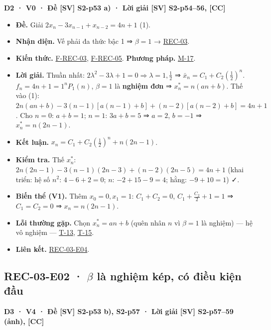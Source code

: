 \documentclass[
  10pt,
  twoside,openany]{book}
\providecommand{\tightlist}{%
  \setlength{\itemsep}{0pt}\setlength{\parskip}{0pt}}
\begin{document}
\textbf{D2 · V0 · Đề {[}SV{]} S2-p53 a) · Lời giải {[}SV{]} S2-p54--56,
{[}CC{]}}

\begin{itemize}
\tightlist
\item
  \textbf{Đề.} Giải \(2x_n-3x_{n-1}+x_{n-2}=4n+1\) (1).
\item
  \textbf{Nhận diện.} Vế phải đa thức bậc 1 ⇒ \(\beta=1\) →
  \protect\hyperlink{REC-03}{REC-03}.
\item
  \textbf{Kiến thức.} \protect\hyperlink{F-REC-03}{F-REC-03},
  \protect\hyperlink{F-REC-05}{F-REC-05}. \textbf{Phương pháp.}
  \protect\hyperlink{M-17}{M-17}.
\item
  \textbf{Lời giải.} Thuần nhất:
  \(2\lambda^2-3\lambda+1=0\Rightarrow\lambda=1,\frac12\) ⇒
  \(\bar x_n=C_1+C_2\left(\frac12\right)^n\). \(f_n=4n+1=1^n P_1(n)\),
  \(\beta=1\) là \textbf{nghiệm đơn} ⇒ \(x_n^*=n(an+b)\). Thế vào (1):
  \(2n(an+b)-3(n-1)[a(n-1)+b]+(n-2)[a(n-2)+b]=4n+1\). Cho \(n=0\):
  \(a+b=1\); \(n=1\): \(3a+b=5\) ⇒ \(a=2\), \(b=-1\) ⇒
  \(x_n^*=n(2n-1)\).
\item
  \textbf{Kết luận.} \(x_n=C_1+C_2\left(\frac12\right)^n+n(2n-1)\).
\item
  \textbf{Kiểm tra.} Thế \(x_n^*\):
  \(2n(2n-1)-3(n-1)(2n-3)+(n-2)(2n-5)=4n+1\) (khai triển: hệ số \(n^2\):
  \(4-6+2=0\); \(n\): \(-2+15-9=4\); hằng: \(-9+10=1\)) ✓.
\item
  \textbf{Biến thể (V1).} Thêm \(x_0=0,x_1=1\): \(C_1+C_2=0\),
  \(C_1+\frac{C_2}{2}+1=1\) ⇒ \(C_1=C_2=0\) ⇒ \(x_n=n(2n-1)\).
\item
  \textbf{Lỗi thường gặp.} Chọn \(x_n^*=an+b\) (quên nhân \(n\) vì
  \(\beta=1\) là nghiệm) --- hệ vô nghiệm ---
  \protect\hyperlink{T-13}{T-13}, \protect\hyperlink{T-15}{T-15}.
\item
  \textbf{Liên kết.} \protect\hyperlink{REC-03-E04}{REC-03-E04}.
\end{itemize}

\hypertarget{REC-03-E02}{%
\subsection{\texorpdfstring{REC-03-E02 · \(\beta\) là nghiệm kép, có
điều kiện
đầu}{REC-03-E02 · \textbackslash beta là nghiệm kép, có điều kiện đầu}}\label{REC-03-E02}}

\textbf{D3 · V4 · Đề {[}SV{]} S2-p53 b), S2-p57 · Lời giải {[}SV{]}
S2-p57--59 (ảnh), {[}CC{]}}
\end{document}
